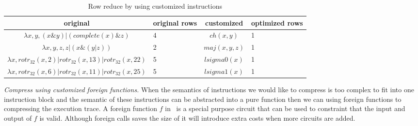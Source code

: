 \begin{table}[!h]
\small
\begin{center}
\caption{Row reduce by using customized instructions}
\label{tbl:foreign-instruction-reduce}
\begin{tabular}{ | c | p{1cm} | c | p{1.5cm} | }
  \hline
  original & original rows & customized & optimized rows\\ 
  \hline
  $\lambda x, y, (x \& y) | (complete(x) \& z)$ & 4 & $ch(x,y)$ & 1 \\
  \hline
  $\lambda x, y, z, z | (x \& (y | z))$ & 2 & $maj(x, y, z)$ & 1\\
  \hline
  $\lambda x, rotr_{32}(x, 2) | rotr_{32}(x, 13) | rotr_{32}(x, 22)$ & 5 & $lsigma0(x)$ & 1 \\
  \hline
  $\lambda x, rotr_{32}(x, 6) | rotr_{32}(x, 11) | rotr_{32}(x, 25)$ & 5 & $lsigma1(x)$ & 1\\
 \hline
\end{tabular}

\end{center}
\end{table}

\smallskip\noindent\emph{Compress using customized foreign functions.}
When the semantics of instructions we would like to compress is too complex to fit into one instruction block and the semantic of these instructions can be abstracted into a pure function then we can using foreign functions to compressing the execution trace. 
A foreign function $f$ in \zkwasm\, is a special purpose circuit that can be used to constraint that the input and output of $f$ is valid. Although foreign calls saves the size of it will introduce extra costs when more circuits are added.